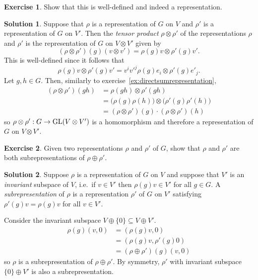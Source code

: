 \documentclass[11pt, a4paper]{report}
\theoremstyle{definition}
\newtheorem{ex}{Exercise}[part]
\newtheorem{sol}{Solution}[part]
\newcommand*{\GL}{\ensuremath\text{GL}}
\begin{document}
\begin{ex}

Show that this is well-defined and indeed a representation.

\end{ex}

\begin{sol}

Suppose that $\rho$ is a representation of $G$ on $V$ and $\rho'$ is a representation of $G$ on $V'$.
Then the \emph{tensor product} $\rho \otimes \rho'$ of the representations $\rho$ and $\rho'$ is the representation of $G$ on $V \otimes V'$ given by
\[
    (\rho \otimes \rho')(g)(v \otimes v') = \rho(g) v \otimes \rho'(g) v'.
\]
This is well-defined since it follows that
\[
    \rho(g)v \otimes \rho'(g)v' = v^i v'^j \rho(g)e_i \otimes \rho'(g)e'_j.
\]
Let $g, h \in G$. Then, similarly to exercise~\ref{ex:directsumrepresentation},
\begin{align*}
    (\rho \otimes \rho')(gh) &= \rho(gh) \otimes \rho'(gh) \\
        &= \bigl( \rho(g) \rho(h) \bigr) \otimes \bigl( \rho'(g) \rho'(h) \bigr) \\
        &= (\rho \otimes \rho')(g) \cdot (\rho \otimes \rho')(h)
\end{align*}
so $\rho \otimes \rho': G \to \GL(V \otimes V')$ is a homomorphism and therefore a representation of $G$ on $V \otimes V'$.

\end{sol}

\begin{ex}

Given two representations $\rho$ and $\rho'$ of $G$, show that $\rho$ and $\rho'$ are both subrepresentations of $\rho \oplus \rho'$.

\end{ex}

\begin{sol}

Suppose $\rho$ is a representation of $G$ on $V$ and suppose that $V'$ is an \emph{invariant} subspace of $V$, i.e.\ if $v \in V'$ then $\rho(g)v \in V'$ for all $g \in G$.
A \emph{subrepresentation} of $\rho$ is a representation $\rho'$ of $G$ on $V'$ satisfying $\rho'(g)v = \rho(g)v$ for all $v \in V'$.

Consider the invariant subspace $V \oplus \{0\} \subseteq V \oplus V'$.
\begin{align*}
    \rho(g) (v, 0) &= \left( \rho(g)v, 0 \right) \\
                   &= \left( \rho(g)v, \rho'(g) 0 \right) \\
                   &= (\rho \oplus \rho')(g) (v, 0)
\end{align*}
so $\rho$ is a subrepresentation of $\rho \oplus \rho'$.
By symmetry, $\rho'$ with invariant subspace $\{0\} \oplus V'$ is also a subrepresentation.

\end{sol}
\end{document}
